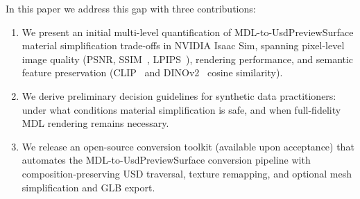 In this paper we address this gap with three contributions:
\begin{enumerate}
    \item We present an initial multi-level quantification of
    MDL-to-UsdPreviewSurface material simplification trade-offs in NVIDIA Isaac
    Sim, spanning pixel-level image quality
    (PSNR, SSIM~\cite{Wang2004Image}, LPIPS~\cite{Zhang2018Unreasonable}),
    rendering performance, and semantic feature preservation
    (CLIP~\cite{Radford2021Learning} and
    DINOv2~\cite{Oquab2023DINOv2} cosine similarity).
    \item We derive preliminary decision guidelines for synthetic data
    practitioners: under what conditions material simplification is safe, and
    when full-fidelity MDL rendering remains necessary.
    \item We release an open-source conversion toolkit (available upon acceptance) that
    automates the MDL-to-UsdPreviewSurface conversion pipeline with
    composition-preserving USD traversal, texture remapping, and optional mesh
    simplification and GLB export.
\end{enumerate}
